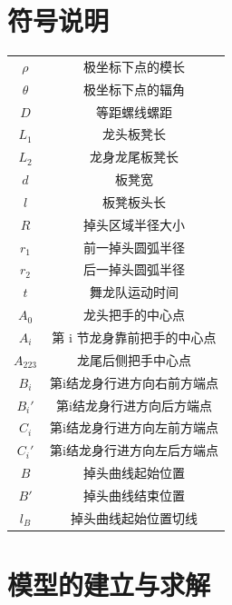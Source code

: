 \documentclass[a4paper]{article}
\begin{document}
	\section{符号说明}
	\begin{table}[H] %
		\captionsetup{skip=4pt} %
		\centering
		\setlength{\arrayrulewidth}{2pt} %
		\begin{tabular}{cc} %
			\hline
			\makebox[0.15\textwidth][c]{符号} & \makebox[0.6\textwidth][c]{说明}  \\
			\hline
			$\rho$ & 极坐标下点的模长  \\
			$\theta$ & 极坐标下点的辐角  \\
			$D$ & 等距螺线螺距  \\
			$L_1$ & 龙头板凳长  \\
			$L_2$ & 龙身龙尾板凳长  \\
			$d$ & 板凳宽  \\
			$l$ & 板凳板头长 \\
			$R$ & 掉头区域半径大小\\
			$r_1$ & 前一掉头圆弧半径\\
			$r_2$ & 后一掉头圆弧半径\\
			$t$ & 舞龙队运动时间  \\
			$A_0$ & 龙头把手的中心点  \\
			$A_i$ & 第 i 节龙身靠前把手的中心点  \\
			$A_{223}$ & 龙尾后侧把手中心点  \\
			$B_i$ & 第i结龙身行进方向右前方端点 \\
			$B_i'$ &  第i结龙身行进方向后方端点 \\
			$C_i$ & 第i结龙身行进方向左前方端点 \\
			$C_i'$ & 第i结龙身行进方向左后方端点 \\
			$B$ & 掉头曲线起始位置 \\
			$B'$ & 掉头曲线结束位置 \\
			$l_B$ & 掉头曲线起始位置切线 \\
			\hline
		\end{tabular}
	\end{table}


	\section{模型的建立与求解}
\end{document}
